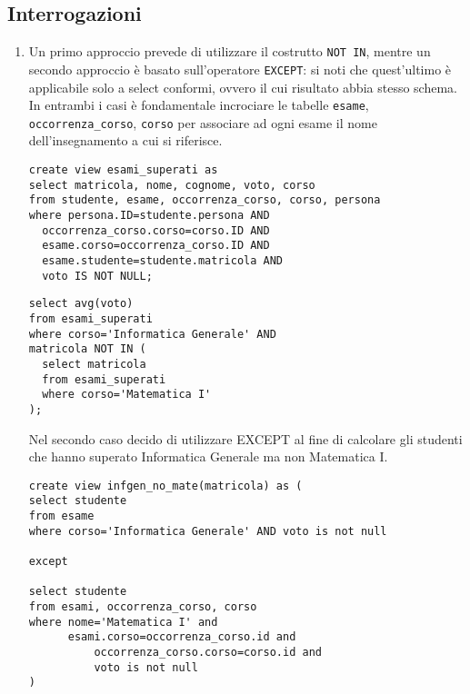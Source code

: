 \documentclass[11pt]{article}
\begin{document}
\subsection{Interrogazioni}



\begin{enumerate}
\item
Un primo approccio prevede di utilizzare il costrutto \texttt{NOT IN}, mentre
un secondo approccio {\`e} basato sull'operatore \texttt{EXCEPT}: si noti che
quest'ultimo {\`e} applicabile solo a select conformi, ovvero il cui risultato
abbia stesso schema. In entrambi i casi {\`e} fondamentale incrociare le tabelle
\texttt{esame}, \texttt{occorrenza\_corso}, \texttt{corso} per associare ad
ogni esame il nome dell'insegnamento a cui si riferisce.
\begin{verbatim}
create view esami_superati as
select matricola, nome, cognome, voto, corso
from studente, esame, occorrenza_corso, corso, persona
where persona.ID=studente.persona AND
  occorrenza_corso.corso=corso.ID AND
  esame.corso=occorrenza_corso.ID AND
  esame.studente=studente.matricola AND
  voto IS NOT NULL;
\end{verbatim}
\begin{verbatim}
select avg(voto)
from esami_superati
where corso='Informatica Generale' AND
matricola NOT IN (
  select matricola
  from esami_superati
  where corso='Matematica I'
);
\end{verbatim}
Nel secondo caso decido di utilizzare EXCEPT al fine di calcolare gli studenti
che hanno superato Informatica Generale ma non Matematica I.
\begin{verbatim}
create view infgen_no_mate(matricola) as (
select studente
from esame
where corso='Informatica Generale' AND voto is not null

except

select studente
from esami, occorrenza_corso, corso
where nome='Matematica I' and
      esami.corso=occorrenza_corso.id and
          occorrenza_corso.corso=corso.id and
          voto is not null
)


\end{verbatim}
\end{enumerate}
\end{document}
